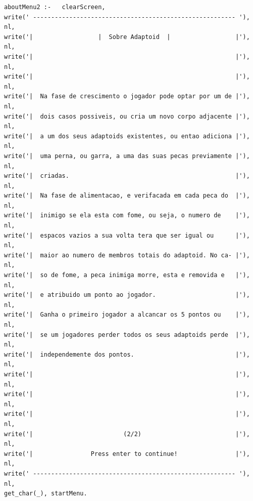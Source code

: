 \documentclass[a4paper]{article}
\begin{document}
\begin{lstlisting}
aboutMenu2 :-   clearScreen,
write(' -------------------------------------------------------- '), nl,
write('|                  |  Sobre Adaptoid  |                  |'), nl,
write('|                                                        |'), nl,
write('|                                                        |'), nl,
write('|  Na fase de crescimento o jogador pode optar por um de |'), nl,
write('|  dois casos possiveis, ou cria um novo corpo adjacente |'), nl,
write('|  a um dos seus adaptoids existentes, ou entao adiciona |'), nl,
write('|  uma perna, ou garra, a uma das suas pecas previamente |'), nl,
write('|  criadas.                                              |'), nl,
write('|  Na fase de alimentacao, e verifacada em cada peca do  |'), nl,
write('|  inimigo se ela esta com fome, ou seja, o numero de    |'), nl,
write('|  espacos vazios a sua volta tera que ser igual ou      |'), nl,
write('|  maior ao numero de membros totais do adaptoid. No ca- |'), nl,
write('|  so de fome, a peca inimiga morre, esta e removida e   |'), nl,
write('|  e atribuido um ponto ao jogador.                      |'), nl,
write('|  Ganha o primeiro jogador a alcancar os 5 pontos ou    |'), nl,
write('|  se um jogadores perder todos os seus adaptoids perde  |'), nl,
write('|  independemente dos pontos.                            |'), nl,
write('|                                                        |'), nl,
write('|                                                        |'), nl,
write('|                                                        |'), nl,
write('|                         (2/2)                          |'), nl,
write('|                Press enter to continue!                |'), nl,
write(' -------------------------------------------------------- '), nl,
get_char(_), startMenu.


\end{lstlisting}
\end{document}

